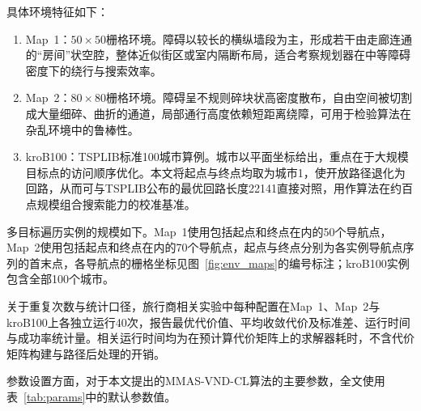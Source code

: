 \documentclass[lettersize,journal]{IEEEtran}
\begin{document}
具体环境特征如下：

\begin{enumerate}

\item Map~1：$50\times 50$栅格环境。障碍以较长的横纵墙段为主，形成若干由走廊连通的“房间”状空腔，整体近似街区或室内隔断布局，适合考察规划器在中等障碍密度下的绕行与搜索效率。

\item Map~2：$80\times 80$栅格环境。障碍呈不规则碎块状高密度散布，自由空间被切割成大量细碎、曲折的通道，局部通行高度依赖短距离绕障，可用于检验算法在杂乱环境中的鲁棒性。

\item kroB100：TSPLIB标准100城市算例。城市以平面坐标给出，重点在于大规模目标点的访问顺序优化。本文将起点与终点均取为城市1，使开放路径退化为回路，从而可与TSPLIB公布的最优回路长度22141直接对照，用作算法在约百点规模组合搜索能力的校准基准。

\end{enumerate}

多目标遍历实例的规模如下。Map~1使用包括起点和终点在内的50个导航点，Map~2使用包括起点和终点在内的70个导航点，起点与终点分别为各实例导航点序列的首末点，各导航点的栅格坐标见图~\textcolor{blue}{\ref{fig:env_maps}}的编号标注；kroB100实例包含全部100个城市。

关于重复次数与统计口径，旅行商相关实验中每种配置在Map~1、Map~2与kroB100上各独立运行40次，报告最优代价值、平均收敛代价及标准差、运行时间与成功率统计量。相关运行时间均为在预计算代价矩阵上的求解器耗时，不含代价矩阵构建与路径后处理的开销。

参数设置方面，对于本文提出的MMAS-VND-CL算法的主要参数，全文使用表~\textcolor{blue}{\ref{tab:params}}中的默认参数值。
\end{document}
